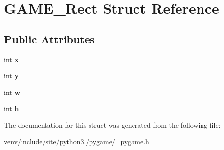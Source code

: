 \hypertarget{struct_g_a_m_e___rect}{}\section{G\+A\+M\+E\+\_\+\+Rect Struct Reference}
\label{struct_g_a_m_e___rect}
\subsection*{Public Attributes}
\begin{DoxyCompactItemize}
\item 
\mbox{\label{struct_g_a_m_e___rect_a23ec041bc338ec0798414b9558592b55}} 
int {\bfseries x}
\item 
\mbox{\label{struct_g_a_m_e___rect_aefd438e3954fa6a8c4205bde866e96f0}} 
int {\bfseries y}
\item 
\mbox{\label{struct_g_a_m_e___rect_aa5113cae1939a100e1ebb65055a8f5aa}} 
int {\bfseries w}
\item 
\mbox{\label{struct_g_a_m_e___rect_a5852e1136a847290b8698a83520205ec}} 
int {\bfseries h}
\end{DoxyCompactItemize}


The documentation for this struct was generated from the following file\+:\begin{DoxyCompactItemize}
\item 
venv/include/site/python3./pygame/\+\_\+pygame.\+h\end{DoxyCompactItemize}
